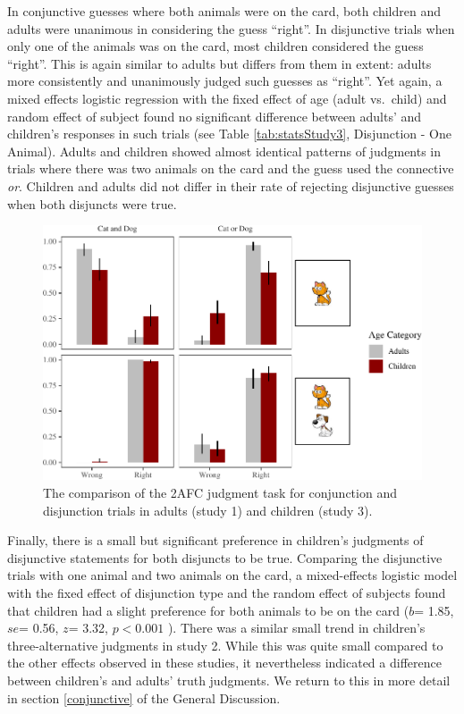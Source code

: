 \documentclass[floatsintext,man]{apa6}
\theoremstyle{definition}
\theoremstyle{definition}
\theoremstyle{definition}
\theoremstyle{remark}
\begin{document}
In conjunctive guesses where both animals were on the card, both
children and adults were unanimous in considering the guess
\enquote{right}. In disjunctive trials when only one of the animals was
on the card, most children considered the guess \enquote{right}. This is
again similar to adults but differs from them in extent: adults more
consistently and unanimously judged such guesses as \enquote{right}. Yet
again, a mixed effects logistic regression with the fixed effect of age
(adult vs.~child) and random effect of subject found no significant
difference between adults' and children's responses in such trials (see
Table \ref{tab:statsStudy3}, Disjunction - One Animal). Adults and
children showed almost identical patterns of judgments in trials where
there was two animals on the card and the guess used the connective
\emph{or}. Children and adults did not differ in their rate of rejecting
disjunctive guesses when both disjuncts were true.

\begin{figure}
\centering
\includegraphics{figs/BinaryPlotComp-1.pdf}
\caption{\label{fig:BinaryPlotComp}The comparison of the 2AFC judgment task
for conjunction and disjunction trials in adults (study 1) and children
(study 3).}
\end{figure}

Finally, there is a small but significant preference in children's
judgments of disjunctive statements for both disjuncts to be true.
Comparing the disjunctive trials with one animal and two animals on the
card, a mixed-effects logistic model with the fixed effect of
disjunction type and the random effect of subjects found that children
had a slight preference for both animals to be on the card (\(b\)= 1.85,
\(se\)= 0.56, \(z\)= 3.32, \(p < 0.001\) ). There was a similar small
trend in children's three-alternative judgments in study 2. While this
was quite small compared to the other effects observed in these studies,
it nevertheless indicated a difference between children's and adults'
truth judgments. We return to this in more detail in section
\ref{conjunctive} of the General Discussion.
\end{document}
